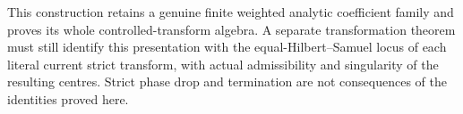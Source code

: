 \begin{remark}
This construction retains a genuine finite weighted analytic coefficient family
and proves its whole controlled-transform algebra. A separate transformation
theorem must still identify this presentation with the equal-Hilbert--Samuel
locus of each literal current strict transform, with actual admissibility and
singularity of the resulting centres. Strict phase drop and termination are not
consequences of the identities proved here.
\end{remark}
